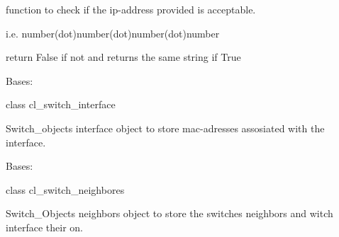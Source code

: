 \documentclass[letterpaper,10pt,english]{sphinxmanual}
\begin{document}
\begin{fulllineitems}
\begin{fulllineitems}
function to check if the ip-address provided is acceptable.

i.e. number(dot)number(dot)number(dot)number

return False if not and returns the same string if True

\end{fulllineitems}


\begin{fulllineitems}
\label{Switch_Object:Switch_Object.Sw_Object.cl_switch_interface}
Bases: 

class cl\_switch\_interface

Switch\_objects interface object to store mac-adresses assosiated with the interface.

\end{fulllineitems}


\begin{fulllineitems}
\label{Switch_Object:Switch_Object.Sw_Object.cl_switch_neighbors}
Bases: 

class cl\_switch\_neighbores

Switch\_Objects neighbors object to store the switches neighbors and witch interface their on.

\begin{fulllineitems}
\label{Switch_Object:Switch_Object.Sw_Object.cl_switch_neighbors.interface}
\end{fulllineitems}


\begin{fulllineitems}
\label{Switch_Object:Switch_Object.Sw_Object.cl_switch_neighbors.ip_address}
\end{fulllineitems}



\end{fulllineitems}
\end{fulllineitems}
\end{document}
